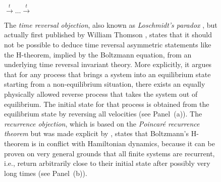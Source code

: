 \documentclass[a4paper,12pt,listof=totoc,index=totoc,bibliography=totoc,headsepline=false,headings=normal,BCOR16.153846mm,DIV12,headinclude,twoside,cleardoublepage=empty,numbers=noenddot,final]{scrreprt}
\theoremstyle{mystyle}
\numberwithin{equation}{section}
\numberwithin{figure}{section}
\numberwithin{lemma}{section}
\numberwithin{theorem}{section}
\numberwithin{corollary}{section}
\numberwithin{definition}{section}
\numberwithin{conjecture}{section}
\numberwithin{observation}{section}
\newcommand{\+}{\mkern2mu}
\DeclareMathOperator{\1}{\mathds{1}}
\begin{document}
\begin{figure}[bt]
\begin{itemize}
\begin{center}
      $\overset{t}{\longrightarrow} \dots \overset{t}{\longrightarrow}$
    \end{center}    
  \end{itemize}
  \caption{The \emph{time reversal objection}, also known as \emph{Loschmidt's paradox} \cite{Loschmidt1877}, but actually first published by William Thomson \cite{ThomsonLordKelvin1874}, states that it should not be possible to deduce time reversal asymmetric statements like the H-theorem, implied by the Boltzmann equation, from an underlying time reversal invariant theory. More explicitly, it argues that for any process that brings a system into an equilibrium state starting from a non-equilibrium situation, there exists an equally physically allowed reverse process that takes the system out of equilibrium. The initial state for that process is obtained from the equilibrium state by reversing all velocities (see Panel~(a)).
The \emph{recurrence objection}, which is based on the \emph{Poincaré recurrence theorem} but was made explicit by \textcite{Zermelo1896}, states that Boltzmann's H-theorem is in conflict with Hamiltonian dynamics, because it can be proven on very general grounds that all finite systems are recurrent, i.e., return arbitrarily close to their initial state after possibly very long times (see Panel~(b)).}
  \label{fig:timereversalandrecurrenceobjection}
\end{figure}
\end{document}
